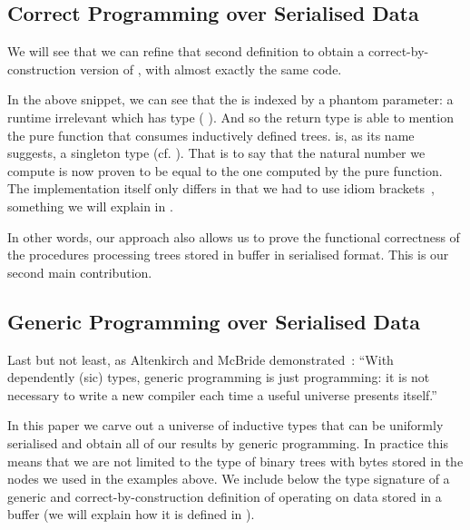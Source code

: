 \subsection{Correct Programming over Serialised Data}

We will see that we can refine that second definition to obtain
a correct-by-construction version of
, with almost exactly the same code.

\begin{center}
  \begin{minipage}{.7\textwidth}
  \end{minipage}
\end{center}

In the above snippet, we can see that the  is indexed
by a phantom parameter: a runtime irrelevant  which has type
( ).
%
And so the return type is able to mention the pure 
function that consumes inductively defined trees.
%
 is, as its name suggests, a singleton type
(cf. ). That is
to say that the natural number we compute is now proven to be equal to the
one computed by the pure  function.
%
The implementation itself only differs in that we had to use idiom
brackets~\cite{DBLP:journals/jfp/McbrideP08}, something we will explain
in .

In other words, our approach also allows us to prove the functional
correctness of the  procedures processing trees stored
in buffer in serialised format. This is our second main contribution.

\subsection{Generic Programming over Serialised Data}

Last but not least, as Altenkirch and McBride
demonstrated~\cite{DBLP:conf/ifip2-1/AltenkirchM02}:
``With dependently (sic) types, generic programming is just programming:
it is not necessary to write a new compiler each time a useful
universe presents itself.''

In this paper we carve out a universe of inductive types that can be
uniformly serialised and obtain all of our results by generic programming.
%
In practice this means that we are not limited to the type of binary trees
with bytes stored in the nodes we used in the examples above.
%
We include below the type signature of a generic and correct-by-construction
definition of  operating on data stored in a buffer
(we will explain how it is defined in ).

